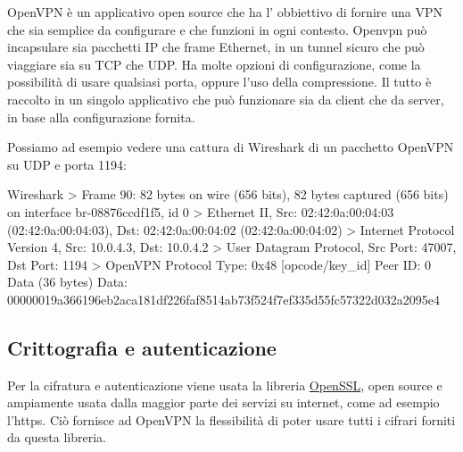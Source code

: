 OpenVPN è un applicativo open source che ha l' obbiettivo di fornire una VPN che sia semplice da configurare e che funzioni in ogni contesto. Openvpn può incapsulare sia pacchetti IP che frame Ethernet, in un tunnel sicuro che può viaggiare sia su TCP che UDP. Ha molte opzioni di configurazione, come la possibilità di usare qualsiasi porta, oppure l'uso della compressione. Il tutto è raccolto in un singolo applicativo che può funzionare sia da client che da server, in base alla configurazione fornita.

Possiamo ad esempio vedere una cattura di Wireshark di un pacchetto OpenVPN su UDP e porta 1194:

\begin{bashcode}{Wireshark}{}
> Frame 90: 82 bytes on wire (656 bits), 82 bytes captured (656 bits) on interface br-08876ccdf1f5, id 0
> Ethernet II, Src: 02:42:0a:00:04:03 (02:42:0a:00:04:03), Dst: 02:42:0a:00:04:02 (02:42:0a:00:04:02)
> Internet Protocol Version 4, Src: 10.0.4.3, Dst: 10.0.4.2
> User Datagram Protocol, Src Port: 47007, Dst Port: 1194
> OpenVPN Protocol
Type: 0x48 [opcode/key_id]
Peer ID: 0
Data (36 bytes)
Data: 00000019a366196eb2aca181df226faf8514ab73f524f7ef335d55fc57322d032a2095e4
\end{bashcode}

\subsection{Crittografia e autenticazione}
\label{subsec:auth}

Per la cifratura e autenticazione viene usata la libreria \href{https://en.wikipedia.org/wiki/OpenSSL}{OpenSSL}, open source e ampiamente usata dalla maggior parte dei servizi su internet, come ad esempio l'https. Ciò fornisce ad OpenVPN la flessibilità di poter usare tutti i cifrari forniti da questa libreria.

